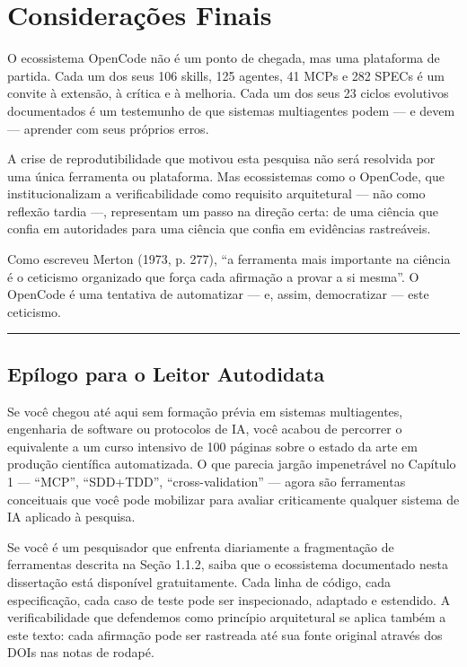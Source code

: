 \section{Considerações Finais}

O ecossistema OpenCode não é um ponto de chegada, mas uma plataforma de partida. Cada um dos seus 106 skills, 125 agentes, 41 MCPs e 282 SPECs é um convite à extensão, à crítica e à melhoria. Cada um dos seus 23 ciclos evolutivos documentados é um testemunho de que sistemas multiagentes podem --- e devem --- aprender com seus próprios erros.

A crise de reprodutibilidade que motivou esta pesquisa não será resolvida por uma única ferramenta ou plataforma. Mas ecossistemas como o OpenCode, que institucionalizam a verificabilidade como requisito arquitetural --- não como reflexão tardia ---, representam um passo na direção certa: de uma ciência que confia em autoridades para uma ciência que confia em evidências rastreáveis.

Como escreveu Merton (1973, p. 277), ``a ferramenta mais importante na ciência é o ceticismo organizado que força cada afirmação a provar a si mesma''. O OpenCode é uma tentativa de automatizar --- e, assim, democratizar --- este ceticismo.

\vspace{0.5cm}
\begin{center}
\rule{0.5\textwidth}{0.5pt}
\end{center}
\vspace{0.3cm}

\subsection*{Epílogo para o Leitor Autodidata}

Se você chegou até aqui sem formação prévia em sistemas multiagentes, engenharia de software ou protocolos de IA, você acabou de percorrer o equivalente a um curso intensivo de 100 páginas sobre o estado da arte em produção científica automatizada. O que parecia jargão impenetrável no Capítulo 1 --- ``MCP'', ``SDD+TDD'', ``cross-validation'' --- agora são ferramentas conceituais que você pode mobilizar para avaliar criticamente qualquer sistema de IA aplicado à pesquisa.

Se você é um pesquisador que enfrenta diariamente a fragmentação de ferramentas descrita na Seção 1.1.2, saiba que o ecossistema documentado nesta dissertação está disponível gratuitamente. Cada linha de código, cada especificação, cada caso de teste pode ser inspecionado, adaptado e estendido. A verificabilidade que defendemos como princípio arquitetural se aplica também a este texto: cada afirmação pode ser rastreada até sua fonte original através dos DOIs nas notas de rodapé.

